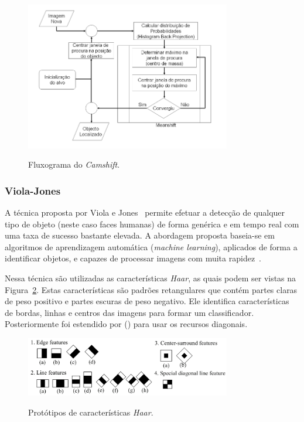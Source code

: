 \begin{figure}[!hbtp]
  \centering
   \caption{Fluxograma do \textit{Camshift}.}
    \includegraphics[width = 0.8\textwidth]{Caps/Figs/ref-teorico/camshift.png}
   \label{fig:camshift}
\end{figure}

\subsubsection{Viola-Jones}
\label{subsubsec:violaJones}

A técnica proposta por Viola e Jones~\cite{viola2001rapid} permite efetuar a detecção de qualquer tipo de objeto (neste caso faces humanas) de forma genérica e em tempo real com uma taxa de sucesso bastante elevada. A abordagem proposta baseia-se em algoritmos de aprendizagem automática (\textit{machine learning}), aplicados de forma a identificar objetos, e capazes de processar imagens com muita rapidez~\cite{peixoto2012deteccao}.

Nessa técnica são utilizadas as características \textit{Haar}, as quais podem ser vistas na Figura~\ref{fig:haarfeatures}. Estas características são padrões retangulares que contém partes claras de peso positivo e partes escuras de peso negativo. Ele identifica características de bordas, linhas e centros das imagens para formar um classificador. Posteriormente foi estendido por \citeauthor{lienhart2002extended} (\citeyear{lienhart2002extended}) para usar os recursos diagonais. 

\begin{figure}[!hbtp]
  \centering
   \caption{Protótipos de características \textit{Haar}.}
    \includegraphics[width = 0.8\textwidth]{Caps/Figs/ref-teorico/haar-features.png}
   \label{fig:haarfeatures}
\end{figure}

